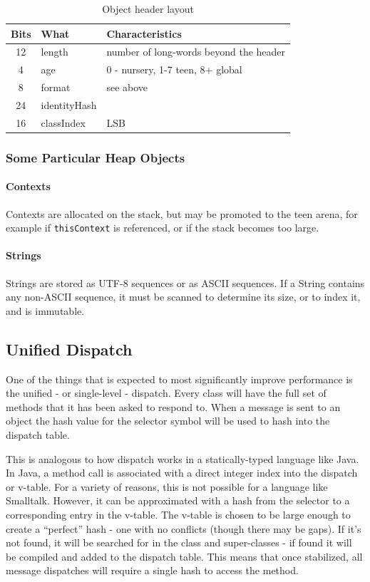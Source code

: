 \documentclass[
]{ceurart}
\begin{document}
\begin{table}\label{header-word}
  \caption{Object header layout}
  \begin{tabular}{c|l|l}
 Bits &  What         &  Characteristics\\
\hline
    12   &  length       &  number of long-words beyond the header\\
    4 & age & 0 - nursery, 1-7 teen, 8+ global \\
 8    &   format & see above\\
 24   &  identityHash &\\
 16   &  classIndex   &  LSB\\
  \end{tabular}
\end{table}

\subsubsection{Some Particular Heap Objects}
\paragraph{Contexts}
Contexts are allocated on the stack, but may be promoted to the teen arena, for example if \verb_thisContext_ is referenced, or if the stack becomes too large.
\paragraph{Strings}
Strings are stored as UTF-8 sequences or as ASCII sequences.
If a String contains any non-ASCII sequence, it must be scanned to determine its size, or to index it, and is immutable.


\subsection{Unified Dispatch}\label{unified-dispatch}

One of the things that is expected to most significantly improve performance is the unified - or single-level - dispatch.
Every class will have the full set of methods that it has been asked to respond to.
When a message is sent to an object the hash value for the selector symbol will be used to hash into the dispatch table.

This is analogous to how dispatch works in a statically-typed language like Java.
In Java, a method call is associated with a direct integer index into the dispatch or v-table.
For a variety of reasons, this is not possible for a language like Smalltalk.
However, it can be approximated with a hash from the selector to a corresponding entry in the v-table.
The v-table is chosen to be large enough to create a ``perfect'' hash - one with no conflicts (though there may be gaps).
If it's not found, it will be searched for in the class and super-classes - if found it will be compiled and added to the dispatch table.
This means that once stabilized, all message dispatches will require a single hash to access the method.
\end{document}
